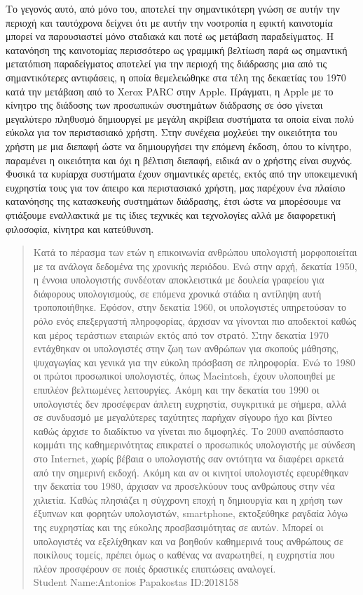 \documentclass[
]{article}
\begin{document}
Το γεγονός αυτό, από μόνο του, αποτελεί την σημαντικότερη γνώση σε αυτήν
την περιοχή και ταυτόχρονα δείχνει ότι με αυτήν την νοοτροπία η εφικτή
καινοτομία μπορεί να παρουσιαστεί μόνο σταδιακά και ποτέ ως μετάβαση
παραδείγματος. Η κατανόηση της καινοτομίας περισσότερο ως γραμμική
βελτίωση παρά ως σημαντική μετατόπιση παραδείγματος αποτελεί για την
περιοχή της διάδρασης μια από τις σημαντικότερες αντιφάσεις, η οποία
θεμελειώθηκε στα τέλη της δεκαετίας του 1970 κατά την μετάβαση από το
Xerox PARC στην Apple. Πράγματι, η Apple με το κίνητρο της διάδοσης των
προσωπικών συστημάτων διάδρασης σε όσο γίνεται μεγαλύτερο πληθυσμό
δημιουργεί με μεγάλη ακρίβεια συστήματα τα οποία είναι πολύ εύκολα για
τον περιστασιακό χρήστη. Στην συνέχεια μοχλεύει την οικειότητα του
χρήστη με μια διεπαφή ώστε να δημιουργήσει την επόμενη έκδοση, όπου το
κίνητρο, παραμένει η οικειότητα και όχι η βέλτιση διεπαφή, ειδικά αν ο
χρήστης είναι συχνός. Φυσικά τα κυρίαρχα συστήματα έχουν σημαντικές
αρετές, εκτός από την υποκειμενική ευχρηστία τους για τον άπειρο και
περιστασιακό χρήστη, μας παρέχουν ένα πλαίσιο κατανόησης της κατασκευής
συστημάτων διάδρασης, έτσι ώστε να μπορέσουμε να φτιάξουμε εναλλακτικά
με τις ίδιες τεχνικές και τεχνολογίες αλλά με διαφορετική φιλοσοφία,
κίνητρα και κατεύθυνση.

\begin{quote}
Κατά το πέρασμα των ετών η επικοινωνία ανθρώπου υπολογιστή μορφοποιείται
με τα ανάλογα δεδομένα της χρονικής περιόδου. Ενώ στην αρχή, δεκατία
1950, η έννοια υπολογιστής συνδέοταν αποκλειστικά με δουλεία γραφείου
για διάφορους υπολογισμούς, σε επόμενα χρονικά στάδια η αντίληψη αυτή
τροποποιήθηκε. Εφόσον, στην δεκατία 1960, οι υπολογιστές υπηρετούσαν το
ρόλο ενός επεξεργαστή πληροφορίας, άρχισαν να γίνονται πιο αποδεκτοί
καθώς και μέρος τεράστιων εταιριών εκτός από τον στρατό. Στην δεκατία
1970 εντάχθηκαν οι υπολογιστές στην ζωη των ανθρώπων για σκοπούς
μάθησης, ψυχαγωγίας και γενικά για την εύκολη πρόσβαση σε πληροφορία.
Ενώ το 1980 οι πρώτοι προσωπικοί υπολογιστές, όπως Macintosh, έχουν
υλοποιηθεί με επιπλέον βελτιωμένες λειτουργίες. Ακόμη και την δεκατία
του 1990 οι υπολογιστές δεν προσέφεραν άπλετη ευχρηστία, συγκριτικά με
σήμερα, αλλά σε συνδυασμό με μεγαλύτερες ταχύτητες παρήχαν σίγουρο ήχο
και βίντεο καθώς άρχισε το διαδίκτυο να γίνεται πιο διμοφηλές. Το 2000
αναπόσπαστο κομμάτι της καθημερινότητας επικρατεί ο προσωπικός
υπολογιστής με σύνδεση στο Internet, χωρίς βέβαια ο υπολογιστής σαν
οντότητα να διαφέρει αρκετά από την σημερινή εκδοχή. Ακόμη και αν οι
κινητοί υπολογιστές εφευρέθηκαν την δεκατία του 1980, άρχισαν να
προσελκύουν τους ανθρώπους στην νέα χιλιετία. Καθώς πλησιάζει η σύγχρονη
εποχή η δημιουργία και η χρήση των έξυπνων και φορητών υπολογιστών,
smartphone, εκτοξεύθηκε ραγδαία λόγω της ευχρηστίας και της εύκολης
προσβασιμότητας σε αυτών. Μπορεί οι υπολογιστές να εξελίχθηκαν και να
βοηθούν καθημερινά τους ανθρώπους σε ποικίλους τομείς, πρέπει όμως ο
καθένας να αναρωτηθεί, η ευχρηστία που πλέον προσφέρουν σε ποιές
δραστικές επιπτώσεις αναλογεί.\\
Student Name:Antonios Papakostas ID:2018158
\end{quote}
\end{document}
